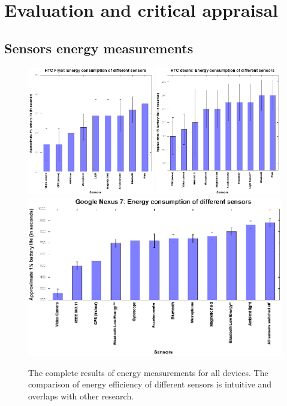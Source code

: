\section{Evaluation and critical appraisal}
\label{s:evaluation}

\subsection{Sensors energy measurements}

\begin{figure}[H]
\centering
\includegraphics[width=0.49\textwidth, scale=0.6]{plots/htc_flyer}
\includegraphics[width=0.49\textwidth, scale=0.6]{plots/htc_desire}
\includegraphics[width=\textwidth, scale=0.9]{plots/google_nexus_7}
\caption{\label{p:all_results} The complete results of energy measurements for all devices. The comparison of energy efficiency of different sensors is intuitive and overlaps with other research. }
\end{figure}


